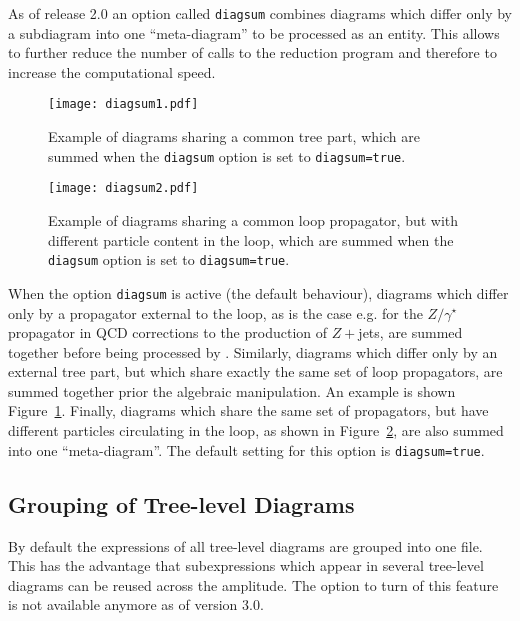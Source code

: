 As of release 2.0 an option called \texttt{diagsum} combines diagrams
which differ only by a subdiagram into one ``meta-diagram'' to be
processed as an entity. This allows to further reduce the number of
calls to the reduction program and therefore to increase the
computational speed. 

\begin{figure}[htb]
\centering
\texttt{[image: diagsum1.pdf]}
\caption{Example of diagrams sharing a common tree part, which are 
summed when the \texttt{diagsum} option is set to \texttt{diagsum=true}.}
\label{fig:diagsum_tree}
\end{figure} 

\begin{figure}[htb]
\centering
\texttt{[image: diagsum2.pdf]}
\caption{Example of diagrams sharing a common loop propagator, 
but with different particle content in the loop, which are summed when
the \texttt{diagsum} option is set to \texttt{diagsum=true}.}
\label{fig:diagsum_particle}
\end{figure} 


When the option \texttt{diagsum} is active (the default behaviour), diagrams which differ only by
a propagator external to the loop, as is the case e.g. for the
$Z/\gamma^\star$ propagator in QCD corrections to the production of
$Z+$jets, are summed together before being processed
by \form{}. Similarly, diagrams which differ only by an external tree
part, but which share exactly the same set of loop propagators, are
summed together prior the algebraic manipulation. An example is shown
Figure~\ref{fig:diagsum_tree}. Finally, diagrams which share the same
set of propagators, but have different particles circulating in the
loop, as shown in Figure~\ref{fig:diagsum_particle}, are also summed
into one ``meta-diagram''. The default setting for this option is \texttt{diagsum=true}.


\subsection*{Grouping of Tree-level Diagrams}

By default the expressions of all tree-level diagrams are grouped into one
file. This has the advantage that subexpressions which appear in several
tree-level diagrams can be reused across the amplitude. The option to turn of this feature is not available anymore as of version 3.0.

